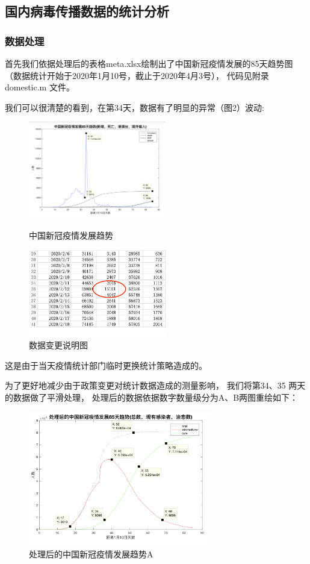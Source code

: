 \documentclass[UTF8]{ctexart}
\begin{document}
\subsection{国内病毒传播数据的统计分析}

\subsubsection{数据处理}
首先我们依据处理后的表格meta.xlsx绘制出了中国新冠疫情发展的85天趋势图
（数据统计开始于2020年1月10号，截止于2020年4月3号），
代码见附录domestic.m 文件。

\par
我们可以很清楚的看到，在第34天，数据有了明显的异常（图2）波动:
\begin{figure}[htbp]
\centering
\begin{minipage}[t]{0.48\textwidth}
\centering
\includegraphics[width=6cm]{2.png}
\caption{中国新冠疫情发展趋势}
\end{minipage}
\begin{minipage}[t]{0.48\textwidth}
\centering
\includegraphics[width=6cm]{excel.png}
\caption{数据变更说明图}
\end{minipage}
\end{figure}
\par 


这是由于当天疫情统计部门临时更换统计策略造成的。
\\
\par 
为了更好地减少由于政策变更对统计数据造成的测量影响，
我们将第34、35 两天的数据做了平滑处理，
处理后的数据依据数字数量级分为A、B两图重绘如下：

\begin{figure}[htbp][H]
\centering
\includegraphics[width=8cm]{3.png} 
\caption{处理后的中国新冠疫情发展趋势A}
\end{figure}
\par
\end{document}

